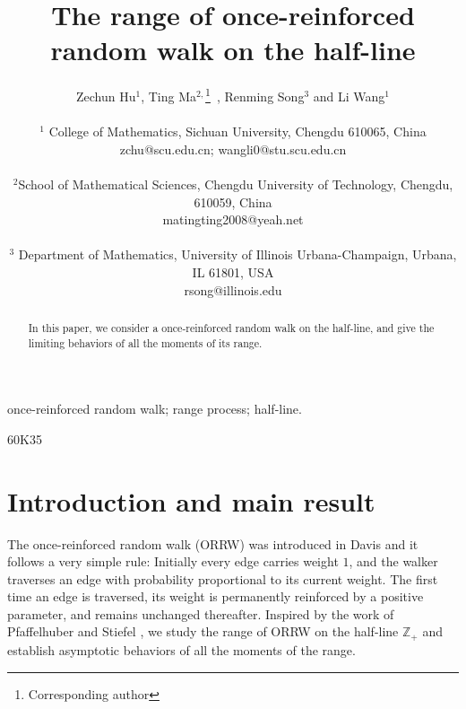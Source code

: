 \documentclass[12pt]{article}
\numberwithin{equation}{section}
\begin{document}
\title{\bf The range of once-reinforced random walk on the half-line}

\author{Zechun Hu$^{1}$, Ting Ma$^{2,}$\footnote{Corresponding author}\ ,  Renming  Song$^{3}$   and Li Wang$^{1}$\\ \\
  {\small $^1$ College of Mathematics, Sichuan  University,
 Chengdu 610065, China}\\
 {\small zchu@scu.edu.cn; wangli0@stu.scu.edu.cn}\\ \\
  {\small $^2$School of Mathematical Sciences,
Chengdu University of Technology,  Chengdu, 610059, China}\\
{\small matingting2008@yeah.net} \\ \\
  {\small $^3$ Department of Mathematics,
University of Illinois Urbana-Champaign, Urbana, IL 61801, USA}\\
 {\small rsong@illinois.edu}}
\maketitle

\begin{abstract}

In this paper, we consider a once-reinforced random walk on the half-line, and give
the limiting behaviors of all the moments of its range.
 \end{abstract}

\smallskip

 once-reinforced random walk; range process; half-line.

\smallskip

\quad 60K35


\section{Introduction and main result}

The once-reinforced random walk (ORRW) was introduced in Davis \cite{DB} and it follows a very simple rule: Initially every edge carries weight $1$, and the walker traverses an edge with probability proportional to its current weight. The first time an edge is traversed, its weight is permanently reinforced
by a positive parameter,
and remains unchanged thereafter. Inspired  by the work of Pfaffelhuber and Stiefel \cite{PS}, we study the range of ORRW  on the half-line $\mathbb{Z}_{+}$ and establish asymptotic behaviors of  all the moments of the range.
\end{document}
